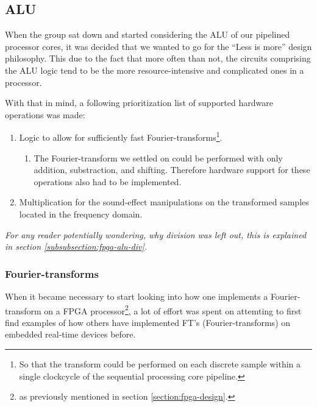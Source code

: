 \FloatBarrier
\newpage
\subsection{ALU}\label{subsection:fpga-alu}

When the group sat down and started considering the ALU of our pipelined
processor cores, it was decided that we wanted to go for the ``Less is more''
design philosophy. This due to the fact that more often than not, the circuits
comprising the ALU logic tend to be the more resource-intensive and complicated
ones in a processor.

With that in mind, a following prioritization list of supported hardware
operations was made:
\begin{enumerate}
	\item Logic to allow for sufficiently fast Fourier-transforms\footnote{So
that the transform could be performed on each discrete sample within a single
clockcycle of the sequential processing core pipeline.}.
	\begin{enumerate}
		\item The Fourier-transform we settled on could be performed with only
addition, substraction, and shifting. Therefore hardware support for these
operations also had to be implemented.
	\end{enumerate}
	\item Multiplication for the sound-effect manipulations on the transformed
samples located in the frequency domain.
\end{enumerate}
\emph{For any reader potentially wondering, why division was left out, this is
explained in section \ref{subsubsection:fpga-alu-div}.}

\FloatBarrier
\subsubsection{Fourier-transforms}\label{subsubsection:fpga-alu-ft}

When it became necessary to start looking into how one implements a
Fourier-transform on a FPGA processor\footnote{as previously mentioned in section
\ref{section:fpga-design}.}, a lot of effort was spent on attemting to first
find examples of how others have implemented FT's (Fourier-transforms) on
embedded real-time devices before.


